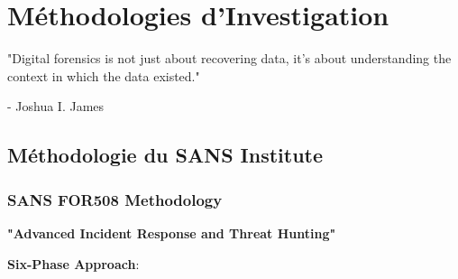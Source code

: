 \chapter{Méthodologies d'Investigation}

\epigraph{"Digital forensics is not just about recovering data, it's about understanding the context in which the data existed."}{- Joshua I. James}
\section{Méthodologie du SANS Institute}

\subsection{SANS FOR508 Methodology}
\textbf{"Advanced Incident Response and Threat Hunting"}

\textbf{Six-Phase Approach}:

